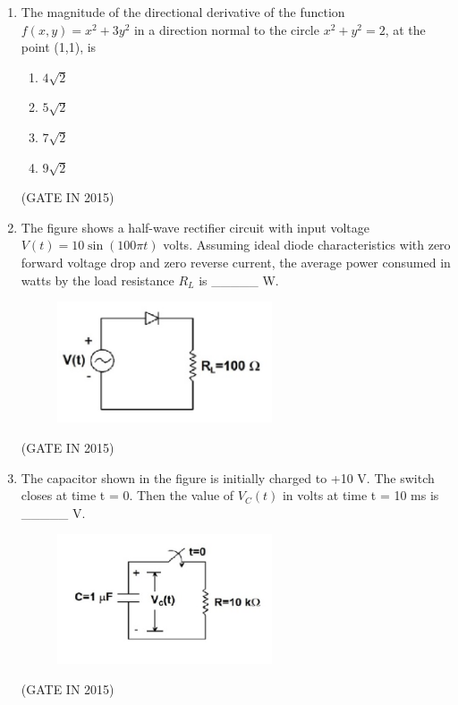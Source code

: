 \documentclass[journal]{IEEEtran}
\begin{document}
\begin{enumerate}
\item The magnitude of the directional derivative of the function $f(x,y) = x^2 + 3y^2$ in a direction normal to the circle $x^2 + y^2 = 2$, at the point (1,1), is

\begin{multicols}{4}
\begin{enumerate}
\item $4\sqrt{2}$
\item $5\sqrt{2}$
\item $7\sqrt{2}$
\item $9\sqrt{2}$
\end{enumerate}
  \end{multicols} \hfill(GATE IN 2015)

\item The figure shows a half-wave rectifier circuit with input voltage $V(t) = 10 \sin (100 \pi t)$ volts. Assuming ideal diode characteristics with zero forward voltage drop and zero reverse current, the average power consumed in watts by the load resistance $R_L$ is \_\_\_\_\_ W.
\begin{figure}[H]
    \centering
      \includegraphics[width=0.6\textwidth]{2.png} 
      \caption{}
    \label{fig:fig2} 
\end{figure}
\hfill(GATE IN 2015)

\item The capacitor shown in the figure is initially charged to +10 V. The switch closes at time t = 0. Then the value of $V_C(t)$ in volts at time t = 10 ms is \_\_\_\_\_ V.
\begin{figure}[H]
    \centering
      \includegraphics[width=0.6\textwidth]{3.png} 
      \caption{}
    \label{fig:fig3} 
\end{figure}
 \hfill(GATE IN 2015)


\end{enumerate}
\end{document}
